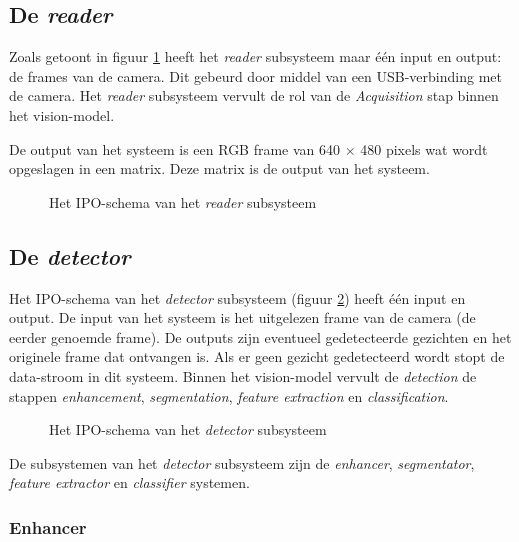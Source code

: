\subsection{De \emph{reader}}

Zoals getoont in figuur \ref{fig:ipo-reader} heeft het \emph{reader} subsysteem
maar één input en output: de frames van de camera. Dit gebeurd door middel van
een USB-verbinding met de camera. Het \emph{reader} subsysteem vervult de rol
van de \emph{Acquisition} stap binnen het vision-model.

De output van het systeem is een RGB frame van 640 $\times$ 480 pixels wat wordt
opgeslagen in een matrix. Deze matrix is de output van het systeem.

\begin{figure}[H]
    \begin{center}
        
    \end{center}
    \caption{Het IPO-schema van het \emph{reader} subsysteem}
    \label{fig:ipo-reader}
\end{figure}

\subsection{De \emph{detector}}

Het IPO-schema van het \emph{detector} subsysteem (figuur \ref{fig:ipo-detector})
heeft één input en output. De input van het systeem is het uitgelezen frame van
de camera (de eerder genoemde frame). De outputs zijn eventueel gedetecteerde gezichten en het originele
frame dat ontvangen is. Als er geen gezicht gedetecteerd wordt stopt de data-stroom
in dit systeem. Binnen het vision-model vervult de \emph{detection} de
stappen \emph{enhancement}, \emph{segmentation}, \emph{feature extraction} en
\emph{classification}.

\begin{figure}[H]
    \begin{center}
        
    \end{center}
    \caption{Het IPO-schema van het \emph{detector} subsysteem}
    \label{fig:ipo-detector}
\end{figure}

De subsystemen van het \emph{detector} subsysteem zijn de \emph{enhancer},
\emph{segmentator}, \emph{feature extractor} en \emph{classifier} systemen.

\subsubsection{Enhancer}

